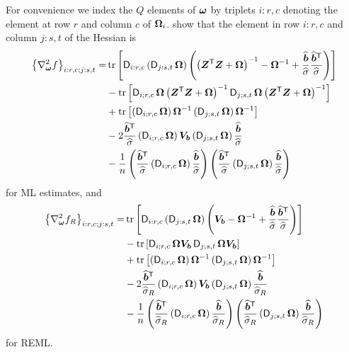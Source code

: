 \documentclass[12pt]{article}
\begin{document}
For convenience we index the $Q$ elements of $\bm{\omega}$ by triplets
$i:r,c$ denoting the element at row $r$ and column $c$ of
$\bm{\Omega}_i$.  \citet{bate:debr:2004} show that the element in row
$i:r,c$ and column $j:s,t$ of the Hessian is
\begin{equation}
  \label{eq:HessianML}
  \begin{aligned}
    \left\{\nabla_{\bm{\omega}}^2 f\right\}_{i:r,c;j:s,t}=
    &\operatorname{tr}\left[\operatorname{\mathsf{D}}_{i:r,c}\left(\operatorname{\mathsf{D}}_{j:s,t}\bm{\Omega}\right)
      \left(\left(\bm{Z}^\mathsf{T}\bm{Z}+\bm{\Omega}\right)^{-1}-\bm{\Omega}^{-1}+
        \frac{\widehat{\bm{b}}}{\widehat{\sigma}}
        \frac{{\widehat{\bm{b}}}^\mathsf{T}}{\widehat{\sigma}}\right)\right]\\
    &-\operatorname{tr}\left[\operatorname{\mathsf{D}}_{i;r,c}\bm{\Omega}\left(\bm{Z}^\mathsf{T}\bm{Z}+\bm{\Omega}\right)^{-1}
      \operatorname{\mathsf{D}}_{j;s,t}\bm{\Omega}\left(\bm{Z}^\mathsf{T}\bm{Z}+\bm{\Omega}\right)^{-1}\right]\\
    &+\operatorname{tr}\left[\left(\operatorname{\mathsf{D}}_{i;r,c}\bm{\Omega}\right)\bm{\Omega}^{-1}
      \left(\operatorname{\mathsf{D}}_{j;s,t}\bm{\Omega}\right)\bm{\Omega}^{-1}\right]\\
    &-2\frac{{\widehat{\bm{b}}}^\mathsf{T}}{\widehat{\sigma}}
    \left(\operatorname{\mathsf{D}}_{i;r,c}\bm{\Omega}\right)\bm{V}_{\bm{b}}
    \left(\operatorname{\mathsf{D}}_{j;s,t}\bm{\Omega}\right)\frac{\widehat{\bm{b}}}{\widehat{\sigma}}\\
    &-\frac{1}{n}
    \left(\frac{{\widehat{\bm{b}}}^\mathsf{T}}{\widehat{\sigma}}
      \left(\operatorname{\mathsf{D}}_{i;r,c}\bm{\Omega}\right)
      \frac{\widehat{\bm{b}}}{\widehat{\sigma}}\right)
    \left(\frac{{\widehat{\bm{b}}}^\mathsf{T}}{\widehat{\sigma}}
      \left(\operatorname{\mathsf{D}}_{j;s,t}\bm{\Omega}\right)
      \frac{\widehat{\bm{b}}}{\widehat{\sigma}}\right)
  \end{aligned}
\end{equation}
for ML estimates, and
\begin{equation}
  \label{eq:HessianREML}
  \begin{aligned}
    \left\{\nabla_{\bm{\omega}}^2 f_R\right\}_{i:r,c;j:s,t}=
    &\operatorname{tr}\left[\operatorname{\mathsf{D}}_{i:r,c}\left(\operatorname{\mathsf{D}}_{j:s,t}\bm{\Omega}\right)
      \left(\bm{V}_{\bm{b}}-\bm{\Omega}^{-1}+
        \frac{\widehat{\bm{b}}}{\widehat{\sigma}}
        \frac{{\widehat{\bm{b}}}^\mathsf{T}}{\widehat{\sigma}}\right)\right]\\
    &-\operatorname{tr}\left[\operatorname{\mathsf{D}}_{i;r,c}\bm{\Omega}\bm{V}_{\bm{b}}
      \operatorname{\mathsf{D}}_{j;s,t}\bm{\Omega}\bm{V}_{\bm{b}}\right]\\
    &+\operatorname{tr}\left[\left(\operatorname{\mathsf{D}}_{i;r,c}\bm{\Omega}\right)\bm{\Omega}^{-1}
      \left(\operatorname{\mathsf{D}}_{j;s,t}\bm{\Omega}\right)\bm{\Omega}^{-1}\right]\\
    &-2\frac{{\widehat{\bm{b}}}^\mathsf{T}}{\widehat{\sigma}_R}
    \left(\operatorname{\mathsf{D}}_{i;r,c}\bm{\Omega}\right)\bm{V}_{\bm{b}}
    \left(\operatorname{\mathsf{D}}_{j;s,t}\bm{\Omega}\right)\frac{\widehat{\bm{b}}}{\widehat{\sigma}_R}\\
    &-\frac{1}{n}
    \left(\frac{{\widehat{\bm{b}}}^\mathsf{T}}{\widehat{\sigma}_R}
      \left(\operatorname{\mathsf{D}}_{i;r,c}\bm{\Omega}\right)
      \frac{\widehat{\bm{b}}}{\widehat{\sigma}_R}\right)
    \left(\frac{{\widehat{\bm{b}}}^\mathsf{T}}{\widehat{\sigma}_R}
      \left(\operatorname{\mathsf{D}}_{j;s,t}\bm{\Omega}\right)
      \frac{\widehat{\bm{b}}}{\widehat{\sigma}_R}\right)
  \end{aligned}
\end{equation}
for REML.
\end{document}
